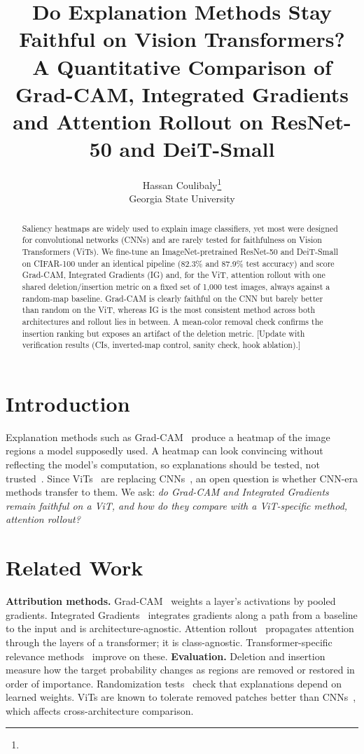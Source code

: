 \documentclass[10pt,twocolumn]{article}
\title{Do Explanation Methods Stay Faithful on Vision Transformers?\\
\large A Quantitative Comparison of Grad-CAM, Integrated Gradients and Attention Rollout on ResNet-50 and DeiT-Small}
\author{Hassan Coulibaly\thanks{\todo{PantherID, email}}\\Georgia State University}
\date{\todo{December 2026}}
\newcommand{\todo}[1]{{\color{red}[#1]}}
\begin{document}
\maketitle

\begin{abstract}
Saliency heatmaps are widely used to explain image classifiers, yet most were designed for convolutional networks (CNNs) and are rarely tested for faithfulness on Vision Transformers (ViTs). We fine-tune an ImageNet-pretrained ResNet-50 and DeiT-Small on CIFAR-100 under an identical pipeline (82.3\% and 87.9\% test accuracy) and score Grad-CAM, Integrated Gradients (IG) and, for the ViT, attention rollout with one shared deletion/insertion metric on a fixed set of 1{,}000 test images, always against a random-map baseline. Grad-CAM is clearly faithful on the CNN but barely better than random on the ViT, whereas IG is the most consistent method across both architectures and rollout lies in between. A mean-color removal check confirms the insertion ranking but exposes an artifact of the deletion metric. \todo{Update with verification results (CIs, inverted-map control, sanity check, hook ablation).}
\end{abstract}

\section{Introduction}
Explanation methods such as Grad-CAM~\cite{gradcam} produce a heatmap of the image regions a model supposedly used. A heatmap can look convincing without reflecting the model's computation, so explanations should be tested, not trusted~\cite{adebayo}. Since ViTs~\cite{vit,deit} are replacing CNNs~\cite{resnet}, an open question is whether CNN-era methods transfer to them. We ask: \emph{do Grad-CAM and Integrated Gradients remain faithful on a ViT, and how do they compare with a ViT-specific method, attention rollout?}

\section{Related Work}
\textbf{Attribution methods.} Grad-CAM~\cite{gradcam} weights a layer's activations by pooled gradients. Integrated Gradients~\cite{ig} integrates gradients along a path from a baseline to the input and is architecture-agnostic. Attention rollout~\cite{rollout} propagates attention through the layers of a transformer; it is class-agnostic. Transformer-specific relevance methods~\cite{chefer} improve on these.
\textbf{Evaluation.} Deletion and insertion~\cite{rise} measure how the target probability changes as regions are removed or restored in order of importance. Randomization tests~\cite{adebayo} check that explanations depend on learned weights. ViTs are known to tolerate removed patches better than CNNs~\cite{naseer}, which affects cross-architecture comparison.
\end{document}
